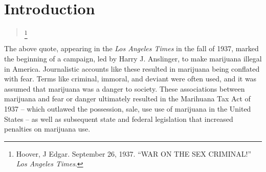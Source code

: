 \chapter{Introduction}

\begin{quotation}
\begin{singlespace}
\footnote{Hoover, J Edgar. September 26, 1937. ``WAR ON THE SEX CRIMINAL!'' \textit{Los Angeles Times}.}
\end{singlespace}
\end{quotation}
The above quote, appearing in the \textit{Los Angeles Times} in the fall of 1937, marked the beginning of a campaign, led by Harry J. Anslinger, to make marijuana illegal in America. Journalistic accounts like these resulted in marijuana being conflated with fear. Terms like criminal, immoral, and deviant were often used, and it was assumed that marijuana was a danger to society. These associations between marijuana and fear or danger ultimately resulted in the Marihuana Tax Act of 1937 -- which outlawed the possession, sale, use use of marijuana in the United States -- as well as subsequent state and federal legislation that increased penalties on marijuana use.  

